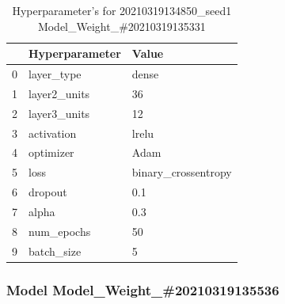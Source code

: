 \begin{table}
\centering
\caption{Hyperparameter's for 20210319134850\_seed1 Model\_Weight\_\#20210319135331}
\label{tab:hyp20210319134850seed1ModelWeight20210319135331}
\begin{tabular}{lll}
\toprule
{} & Hyperparameter &                Value \\
\midrule
0 &     layer\_type &                dense \\
1 &   layer2\_units &                   36 \\
2 &   layer3\_units &                   12 \\
3 &     activation &                lrelu \\
4 &      optimizer &                 Adam \\
5 &           loss &  binary\_crossentropy \\
6 &        dropout &                  0.1 \\
7 &          alpha &                  0.3 \\
8 &     num\_epochs &                   50 \\
9 &     batch\_size &                    5 \\
\bottomrule
\end{tabular}
\end{table}
\subsubsection{Model Model\_Weight\_\#20210319135536}

